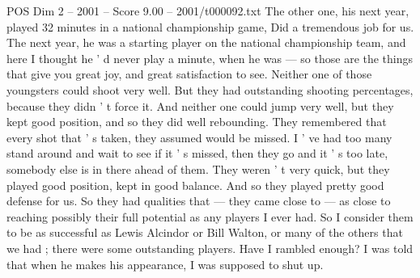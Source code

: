 \begin{textsample}{POS Dim 2 – 2001 – Score 9.00 – 2001/t000092.txt}
The other one, his next year, played 32 minutes in a national championship game, Did a tremendous job for us.
The next year, he was a starting player on the national championship team, and here I thought he ' d never play a minute, when he was — so those are the things that give you great joy, and great satisfaction to see.
Neither one of those youngsters could shoot very well.
But they had outstanding shooting percentages, because they didn ' t force it.
And neither one could jump very well, but they kept good position, and so they did well rebounding.
They remembered that every shot that ' s taken, they assumed would be missed.
I ' ve had too many stand around and wait to see if it ' s missed, then they go and it ' s too late, somebody else is in there ahead of them.
They weren ' t very quick, but they played good position, kept in good balance.
And so they played pretty good defense for us.
So they had qualities that — they came close to — as close to reaching possibly their full potential as any players I ever had.
So I consider them to be as successful as Lewis Alcindor or Bill Walton, or many of the others that we had ; there were some outstanding players.
Have I rambled enough?
I was told that when he makes his appearance, I was supposed to shut up.

\end{textsample}

